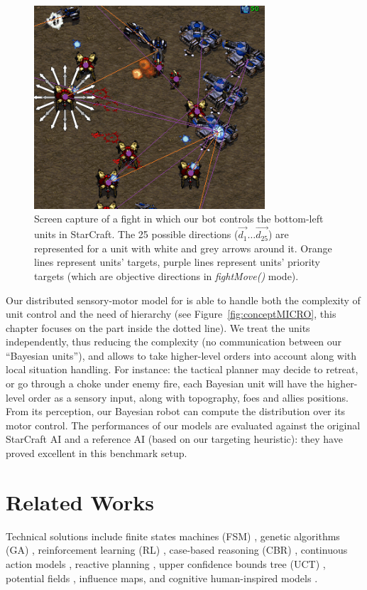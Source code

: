 \begin{figure}
\begin{center}
\includegraphics[width=8.6cm]{images/SC_fight_3b.png}
\end{center}
\caption{Screen capture of a fight in which our bot controls the bottom-left units in StarCraft. The 25 possible directions ($\vec{d_1} \dots \vec{d_{25}}$) are represented for a unit with white and grey arrows around it. Orange lines represent units' targets, purple lines represent units' priority targets (which are objective directions in \textit{fightMove()} mode).}
\label{fig:sc_fight}
\end{figure}

Our distributed sensory-motor model for  is able to handle both the complexity of unit control and the need of hierarchy (see Figure~\ref{fig:conceptMICRO}, this chapter focuses on the part inside the dotted line). We treat the units independently, thus reducing the complexity (no communication between our ``Bayesian units''), and allows to take higher-level orders into account along with local situation handling. For instance: the tactical planner may decide to retreat, or go through a choke under enemy fire, each Bayesian unit will have the higher-level order as a sensory input, along with topography, foes and allies positions. From its perception, our Bayesian robot \citep{Lebeltel04} can compute the distribution over its motor control. The performances of our models are evaluated against the original StarCraft AI and a reference AI (based on our targeting heuristic): they have proved excellent in this benchmark setup.


\section{Related Works}
Technical solutions include finite states machines (FSM) \citep{FSM}, genetic algorithms (GA) \citep{GA,Bakkes04,teamCompositionRTS}, reinforcement learning (RL) \citep{Marthi05concurrenthierarchical,Madeira06}, case-based reasoning (CBR) \citep{LTW,CBR-RL}, continuous action models \citep{Molineaux08}, reactive planning \citep{WeberCIG10}, upper confidence bounds tree (UCT) \citep{UCT}, potential fields \citep{Hagelback2009}, influence maps\citep{teamCompositionRTS}, and cognitive human-inspired models \citep{SORTS}.


